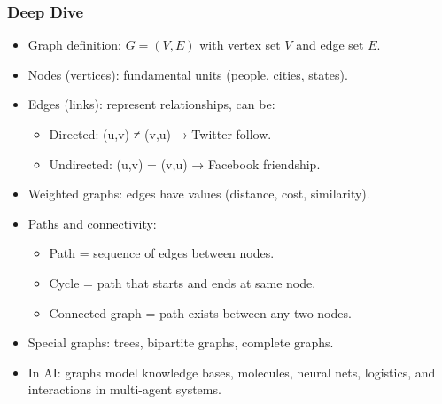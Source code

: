 \documentclass[
  letterpaper,
  DIV=11,
  numbers=noendperiod]{scrreprt}
\providecommand{\tightlist}{%
  \setlength{\itemsep}{0pt}\setlength{\parskip}{0pt}}
\begin{document}
\subsubsection{Deep Dive}\label{deep-dive-170}

\begin{itemize}
\item
  Graph definition: \(G = (V, E)\) with vertex set \(V\) and edge set
  \(E\).
\item
  Nodes (vertices): fundamental units (people, cities, states).
\item
  Edges (links): represent relationships, can be:

  \begin{itemize}
  \tightlist
  \item
    Directed: (u,v) ≠ (v,u) → Twitter follow.
  \item
    Undirected: (u,v) = (v,u) → Facebook friendship.
  \end{itemize}
\item
  Weighted graphs: edges have values (distance, cost, similarity).
\item
  Paths and connectivity:

  \begin{itemize}
  \tightlist
  \item
    Path = sequence of edges between nodes.
  \item
    Cycle = path that starts and ends at same node.
  \item
    Connected graph = path exists between any two nodes.
  \end{itemize}
\item
  Special graphs: trees, bipartite graphs, complete graphs.
\item
  In AI: graphs model knowledge bases, molecules, neural nets,
  logistics, and interactions in multi-agent systems.
\end{itemize}
\end{document}
